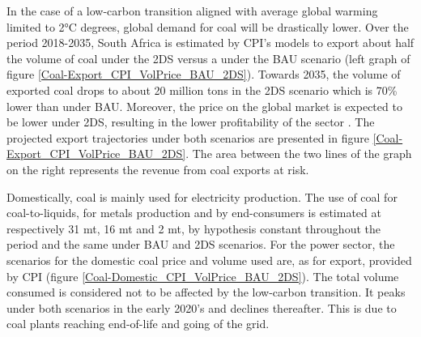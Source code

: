 \documentclass[12pt,english]{article}
\begin{document}
In the case of a low-carbon transition aligned with average global warming limited to 2°C degrees, global demand for coal will be drastically lower. Over the period 2018-2035, South Africa is estimated by CPI's models to export about half the volume of coal under the 2DS versus a under the BAU scenario (left graph of figure \ref{Coal-Export_CPI_VolPrice_BAU_2DS}). %
Towards 2035, the volume of exported coal drops to about 20 million tons in the 2DS scenario which is 70\% lower than under BAU. Moreover, the price on the global market is expected to be lower under 2DS, resulting in the lower profitability of the sector . %
The projected export trajectories under both scenarios are presented in figure \ref{Coal-Export_CPI_VolPrice_BAU_2DS}. The area between the two lines of the graph on the right represents the revenue from coal exports at risk.

Domestically, coal is mainly used for electricity production. %
The use of coal for coal-to-liquids, for metals production and by end-consumers is estimated at respectively 31 mt, 16 mt and 2 mt, by hypothesis constant throughout the period and the same under BAU and 2DS scenarios. For the power sector, the scenarios for the domestic coal price and volume used are, as for export, provided by CPI (figure \ref{Coal-Domestic_CPI_VolPrice_BAU_2DS}).  The total volume consumed is considered not to be affected by the low-carbon transition. It peaks under both scenarios in the early 2020's and declines thereafter. This is due to coal plants reaching end-of-life and going of the grid. 
\end{document}
